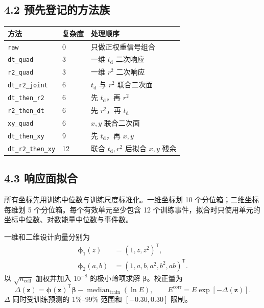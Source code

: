 \documentclass[UTF8,11pt,a4paper,oneside,fontset=none]{ctexart}
\begin{document}
\subsection*{4.2 预先登记的方法族}

\footnotesize
{}
\begin{tabularx}{\textwidth}{@{}C{3.1cm} C{1.5cm} Y@{}}
\toprule
{}\textbf{方法} & \textbf{复杂度} & \textbf{处理顺序}\\
\midrule
\texttt{raw} & 0 & 只做正权重信号组合\\
\texttt{dt\_quad} & 3 & 一维 $t_{\mathrm d}$ 二次响应\\
\texttt{r2\_quad} & 3 & 一维 $r^2$ 二次响应\\
\texttt{dt\_r2\_joint} & 6 & $t_{\mathrm d}$ 与 $r^2$ 联合二次面\\
\texttt{dt\_then\_r2} & 6 & 先 $t_{\mathrm d}$，再 $r^2$\\
\texttt{r2\_then\_dt} & 6 & 先 $r^2$，再 $t_{\mathrm d}$\\
\texttt{xy\_quad} & 6 & $x,y$ 联合二次面\\
\texttt{dt\_then\_xy} & 9 & 先 $t_{\mathrm d}$，再 $x,y$\\
\texttt{dt\_r2\_then\_xy} & 12 & 联合 $t_{\mathrm d},r^2$ 后拟合 $x,y$ 残余\\
\bottomrule
\end{tabularx}
\normalsize

\subsection*{4.3 响应面拟合}

所有坐标先用训练中位数与训练尺度标准化。一维坐标划 10 个分位箱；二维坐标每维划 5 个分位箱。每个有效单元至少包含 12 个训练事件，拟合时只使用单元的坐标中位数、对数能量中位数与事件数。

一维和二维设计向量分别为
\begin{align}
  \symbf{\phi}_{1}(z)&=(1,z,z^2)^{\mathsf T},\\
  \symbf{\phi}_{2}(a,b)&=(1,a,b,a^2,b^2,ab)^{\mathsf T}.
\end{align}
以 $\sqrt{n_{\mathrm{cell}}}$ 加权并加入 $10^{-8}$ 的极小岭项求解 $\symbf{\beta}$。校正量为
\begin{equation}
  \Delta(\symbf z)
  =\symbf{\phi}(\symbf z)^{\mathsf T}\symbf{\beta}
  -\operatorname{median}_{\mathrm{train}}\!\left(\ln E\right),
  \qquad
  E^{\mathrm{corr}}=E\exp[-\Delta(\symbf z)].
\end{equation}
$\Delta$ 同时受训练预测的 1\%--99\% 范围和 $[-0.30,0.30]$ 限制。
\end{document}
